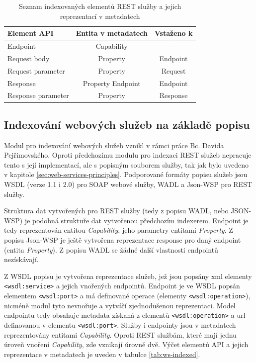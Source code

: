 \documentclass[czech,DP]{thesiskiv}
\begin{document}
\begin{table}[h]
	\centering
	\begin{tabular}{|l | c | c |}
		\hline
		Element API & Entita v metadatech & Vstaženo k\\
		\hline
		\hline
		Endpoint & Capability & - \\
		\hline
		Request body & Property & Endpoint \\
		\hline
		Request parameter & Property & Request \\
		\hline
		Response & Property Endpoint & Endpoint \\
		\hline
		Response parameter & Property & Response \\
		\hline
	\end{tabular}
	\caption{Seznam indexovaných elementů REST služby a jejich reprezentací v metadatech}
	\label{tab:rest-indexed}
\end{table}

\subsection{Indexování webových služeb na základě popisu}

Modul pro indexování webových služeb vznikl v rámci práce Bc. Davida Pejřimovského. Oproti předchozímu modulu pro indexaci REST služeb nepracuje tento s její implementací, ale s popisným souborem služby, tak jak bylo uvedeno v kapitole \ref{sec:web-services-principles}. Podporované formáty popisu služeb jsou WSDL (verze 1.1 i 2.0) pro SOAP webové služby, WADL a Json-WSP pro REST služby\cite{pejrimovsky2015ws}.

Struktura dat vytvořených pro REST služby (tedy z popisu WADL, nebo JSON-WSP) je podobná struktuře dat vytvořenou předchozím indexerem. Endpoint je tedy reprezentován entitou \textit{Capability}, jeho parametry entitami \textit{Property}. Z popisu Json-WSP je ještě vytvořena reprezentace response pro daný endpoint (entita \textit{Property}). Z popisu WADL se žádné další vlastnosti endpointů nezískávají.

Z WSDL popisu je vytvořena reprezentace služeb, jež jsou popsány xml elementy \verb|<wsdl:service>| a jejich vnořených endpointů. Endpoint je ve WSDL popsán elementem \verb|<wsdl:port>| a má definované operace (elementy \verb|<wsdl:operation>|), nicméně modul tyto nevnořuje a vytváří zjednodušenou reprezentaci. Model endpointu tedy obsahuje metadata získaná z elementů \verb|<wsdl:operation>| a url definovanou v elementu \verb|<wsdl:port>|. Služby i endpointy jsou v metadatech reprezentovány entitami \textit{Capability}. Oproti REST službám, které mají jednu úroveň vnoření \textit{Capability}, zde vznikají úrovně dvě. Výčet elementů API a jejich reprezentace v metadatech je uveden v tabulce \ref{tab:ws-indexed}.
\end{document}
